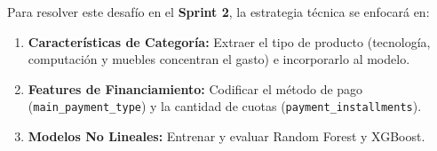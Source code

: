 \documentclass[journal,letterpaper]{IEEEtran}
\begin{document}
Para resolver este desafío en el \textbf{Sprint 2}, la estrategia técnica se enfocará en:
\begin{enumerate}
    \item \textbf{Características de Categoría:} Extraer el tipo de producto (tecnología, computación y muebles concentran el gasto) e incorporarlo al modelo.
    \item \textbf{Features de Financiamiento:} Codificar el método de pago (\texttt{main\_payment\_type}) y la cantidad de cuotas (\texttt{payment\_installments}).
    \item \textbf{Modelos No Lineales:} Entrenar y evaluar Random Forest y XGBoost.
\end{enumerate}
\end{document}
